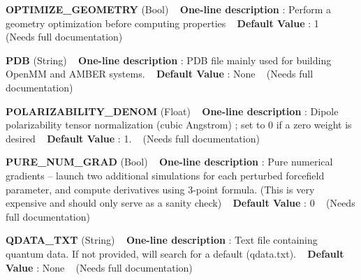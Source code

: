\begin{DoxyItemize}
\item {\bfseries  O\+P\+T\+I\+M\+I\+Z\+E\+\_\+\+G\+E\+O\+M\+E\+T\+RY } (Bool) ~\newline
{\bfseries  One-\/line description }\+: Perform a geometry optimization before computing properties ~\newline
{\bfseries  Default Value }\+: 1 ~\newline
(Needs full documentation)\end{DoxyItemize}
\begin{DoxyItemize}
\item {\bfseries  P\+DB } (String) ~\newline
{\bfseries  One-\/line description }\+: P\+DB file mainly used for building Open\+MM and A\+M\+B\+ER systems. ~\newline
{\bfseries  Default Value }\+: None ~\newline
(Needs full documentation)\end{DoxyItemize}
\begin{DoxyItemize}
\item {\bfseries  P\+O\+L\+A\+R\+I\+Z\+A\+B\+I\+L\+I\+T\+Y\+\_\+\+D\+E\+N\+OM } (Float) ~\newline
{\bfseries  One-\/line description }\+: Dipole polarizability tensor normalization (cubic Angstrom) ; set to 0 if a zero weight is desired ~\newline
{\bfseries  Default Value }\+: 1. ~\newline
(Needs full documentation)\end{DoxyItemize}
\begin{DoxyItemize}
\item {\bfseries  P\+U\+R\+E\+\_\+\+N\+U\+M\+\_\+\+G\+R\+AD } (Bool) ~\newline
{\bfseries  One-\/line description }\+: Pure numerical gradients -- launch two additional simulations for each perturbed forcefield parameter, and compute derivatives using 3-\/point formula. (This is very expensive and should only serve as a sanity check) ~\newline
{\bfseries  Default Value }\+: 0 ~\newline
(Needs full documentation)\end{DoxyItemize}
\begin{DoxyItemize}
\item {\bfseries  Q\+D\+A\+T\+A\+\_\+\+T\+XT } (String) ~\newline
{\bfseries  One-\/line description }\+: Text file containing quantum data. If not provided, will search for a default (qdata.\+txt). ~\newline
{\bfseries  Default Value }\+: None ~\newline
(Needs full documentation)\end{DoxyItemize}
